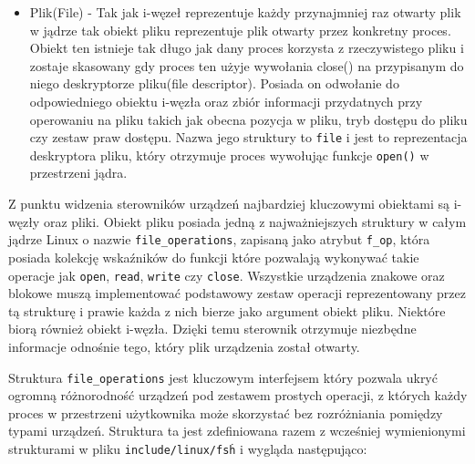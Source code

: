 \documentclass[10pt]{scrartcl}
\begin{document}
\begin{itemize}
\item
  Plik(File) - Tak jak i-węzeł reprezentuje każdy przynajmniej raz otwarty plik w jądrze tak obiekt pliku reprezentuje plik otwarty przez konkretny proces. Obiekt ten istnieje tak długo jak dany proces korzysta z rzeczywistego pliku i zostaje skasowany gdy proces ten użyje wywołania close() na przypisanym do niego deskryptorze pliku(file descriptor). Posiada on odwołanie do odpowiedniego obiektu i-węzła oraz zbiór informacji przydatnych przy operowaniu na pliku takich jak obecna pozycja w pliku, tryb dostępu do pliku czy zestaw praw dostępu. Nazwa jego struktury to \texttt{file} i jest to reprezentacja deskryptora pliku, który otrzymuje proces wywołując funkcje \texttt{open()} w przestrzeni jądra.
\end{itemize}

Z punktu widzenia sterowników urządzeń najbardziej kluczowymi obiektami są i-węzły oraz pliki. Obiekt pliku posiada jedną z najważniejszych struktury w całym jądrze Linux o nazwie \texttt{file\_operations}, zapisaną jako atrybut \texttt{f\_op}, która posiada kolekcję wskaźników do funkcji które pozwalają wykonywać takie operacje jak \texttt{open}, \texttt{read}, \texttt{write} czy \texttt{close}. Wszystkie urządzenia znakowe oraz blokowe muszą implementować podstawowy zestaw operacji reprezentowany przez tą strukturę i prawie każda z nich bierze jako argument obiekt pliku. Niektóre biorą również obiekt i-węzła. Dzięki temu sterownik otrzymuje niezbędne informacje odnośnie tego, który plik urządzenia został otwarty.

Struktura \texttt{file\_operations} jest kluczowym interfejsem który pozwala ukryć ogromną różnorodność urządzeń pod zestawem prostych operacji, z których każdy proces w przestrzeni użytkownika może skorzystać bez rozróżniania pomiędzy typami urządzeń. Struktura ta jest zdefiniowana razem z wcześniej wymienionymi strukturami w pliku \texttt{include/linux/fs\.h} i wygląda następująco:
\end{document}
